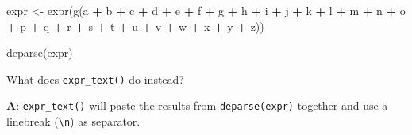 \documentclass[
]{krantz}
\makeatletter
\newenvironment{Shaded}{\begin{snugshade}}{\end{snugshade}}
\newcommand{\KeywordTok}[1]{\textcolor[rgb]{0.13,0.29,0.53}{\textbf{#1}}}
\newcommand{\NormalTok}[1]{#1}
\newcommand{\OperatorTok}[1]{\textcolor[rgb]{0.81,0.36,0.00}{\textbf{#1}}}
\newcommand{\StringTok}[1]{\textcolor[rgb]{0.31,0.60,0.02}{#1}}
\newenvironment{kframe}{%
\medskip{}
\setlength{\fboxsep}{.8em}
 \def\at@end@of@kframe{}%
 \ifinner\ifhmode%
  \def\at@end@of@kframe{\end{minipage}}%
  \begin{minipage}{\columnwidth}%
 \fi\fi%
 \def\FrameCommand##1{\hskip\@totalleftmargin \hskip-\fboxsep
 \colorbox{shadecolor}{##1}\hskip-\fboxsep
     \hskip-\linewidth \hskip-\@totalleftmargin \hskip\columnwidth}%
 \MakeFramed {\advance\hsize-\width
   \@totalleftmargin\z@ \linewidth\hsize
   \@setminipage}}%
 {\par\unskip\endMakeFramed%
 \at@end@of@kframe}
\renewenvironment{Shaded}{\begin{kframe}}{\end{kframe}}
\renewcommand{\KeywordTok} [1]{\textcolor[rgb]{0.00,0.44,0.13}{{#1}}}
\renewcommand{\StringTok}  [1]{\textcolor[rgb]{0.25,0.44,0.63}{{#1}}}
\renewcommand{\NormalTok}  [1]{{#1}}
\makeatother
\begin{document}
\begin{Shaded}
\begin{Highlighting}[]
\NormalTok{expr <-}\StringTok{ }\KeywordTok{expr}\NormalTok{(}\KeywordTok{g}\NormalTok{(a }\OperatorTok{+}\StringTok{ }\NormalTok{b }\OperatorTok{+}\StringTok{ }\NormalTok{c }\OperatorTok{+}\StringTok{ }\NormalTok{d }\OperatorTok{+}\StringTok{ }\NormalTok{e }\OperatorTok{+}\StringTok{ }\NormalTok{f }\OperatorTok{+}\StringTok{ }\NormalTok{g }\OperatorTok{+}\StringTok{ }\NormalTok{h }\OperatorTok{+}\StringTok{ }\NormalTok{i }\OperatorTok{+}\StringTok{ }\NormalTok{j }\OperatorTok{+}\StringTok{ }\NormalTok{k }\OperatorTok{+}\StringTok{ }\NormalTok{l }\OperatorTok{+}\StringTok{ }
\StringTok{                 }\NormalTok{m }\OperatorTok{+}\StringTok{ }\NormalTok{n }\OperatorTok{+}\StringTok{ }\NormalTok{o }\OperatorTok{+}\StringTok{ }\NormalTok{p }\OperatorTok{+}\StringTok{ }\NormalTok{q }\OperatorTok{+}\StringTok{ }\NormalTok{r }\OperatorTok{+}\StringTok{ }\NormalTok{s }\OperatorTok{+}\StringTok{ }\NormalTok{t }\OperatorTok{+}\StringTok{ }\NormalTok{u }\OperatorTok{+}\StringTok{ }\NormalTok{v }\OperatorTok{+}\StringTok{ }\NormalTok{w }\OperatorTok{+}\StringTok{ }\NormalTok{x }\OperatorTok{+}\StringTok{ }\NormalTok{y }\OperatorTok{+}\StringTok{ }\NormalTok{z))}

\KeywordTok{deparse}\NormalTok{(expr)}
\end{Highlighting}
\end{Shaded}

What does \texttt{expr\_text()} do instead?

\textbf{{A}}: \texttt{expr\_text()} will paste the results from \texttt{deparse(expr)} together and use a linebreak (\texttt{\textbackslash{}n}) as separator.
\end{document}

